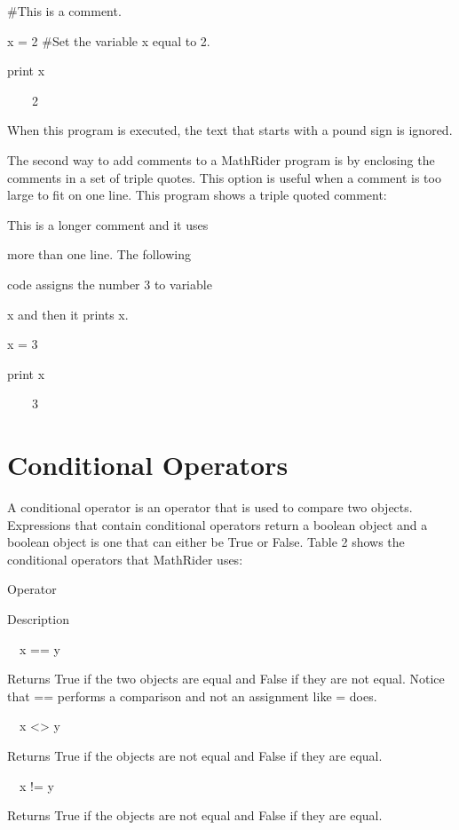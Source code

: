 \documentclass[12pt,oneside]{book}
\begin{document}
\#This is a comment.

x = 2 \#Set the variable x equal to 2.

print x

{\textbar}

\ \ \ \ 2


When this program is executed, the text that starts with a pound sign is ignored. 

The second way to add comments to a MathRider program is by enclosing the comments in a set of triple quotes. This option is useful when a comment is too large to fit on one line. This program shows a triple quoted comment: 

{\textquotedbl}{\textquotedbl}{\textquotedbl}

This is a longer comment and it uses

more than one line. The following

code assigns the number 3 to variable

x and then it prints x.

{\textquotedbl}{\textquotedbl}{\textquotedbl}


x = 3

print x 

{\textbar}

\ \ \ \ 3

\section[Conditional Operators]{Conditional Operators}

A conditional operator is an operator that is used to compare two objects. Expressions that contain conditional operators return a boolean object and a boolean object is one that can either be True or False. Table 2 shows the conditional operators that MathRider uses: 

Operator

Description

\ \ x == y

Returns True if the two objects are equal and False if they are not equal. Notice that == performs a comparison and not an assignment like = does.

\ \ x {\textless}{\textgreater} y

Returns True if the objects are not equal and False if they are equal.

\ \ x != y

Returns True if the objects are not equal and False if they are equal.
\end{document}

